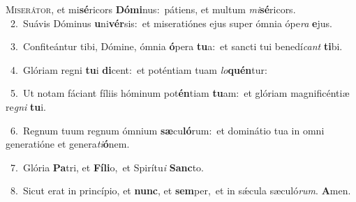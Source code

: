 \lettrine{\initial\textcolor{\initialcolor}{M}}{iserátor,} et mi\-\textbf{sé}\-ricors \textbf{Dó}\-\textbf{mi}nus:~\star pátiens, et multum \textit{mi}\-\textbf{sé}ricors.\\
{\numbfont\textcolor{\numbcolor}{~2.}}~Suávis Dóminus \textbf{u}\-ni\-\textbf{vér}\-sis:~\star et miseratiónes ejus super ómnia ópe\textit{ra} \textbf{e}\-jus.\par
{\numbfont\textcolor{\numbcolor}{~3.}}~Confiteántur tibi, Dómine, ómnia \textbf{ó}\-pera \textbf{tu}\-a:~\star et sancti tui benedí\textit{cant} \textbf{ti}\-bi.\par
{\numbfont\textcolor{\numbcolor}{~4.}}~Glóriam regni \textbf{tu}\-i \textbf{di}\-cent:~\star et poténtiam tuam \textit{lo}\-\textbf{quén}tur:\par
{\numbfont\textcolor{\numbcolor}{~5.}}~Ut notam fáciant fíliis hóminum pot\-\textbf{én}\-tiam \textbf{tu}\-am:~\star et glóriam magnificéntiæ re\textit{gni} \textbf{tu}\-i.\par
{\numbfont\textcolor{\numbcolor}{~6.}}~Regnum tuum regnum ómnium \textbf{sæ}\-cu\-\textbf{ló}\-rum:~\star et dominátio tua in omni generatióne et genera\-\textit{ti}\-\textbf{ó}nem.\par
{\numbfont\textcolor{\numbcolor}{~7.}}~Glória \textbf{Pa}\-tri, et \textbf{Fí}\-\textbf{li}o,~\star et Spirítu\textit{i} \textbf{Sanc}\-to.\par
{\numbfont\textcolor{\numbcolor}{~8.}}~Sicut erat in princípio, et \textbf{nunc}\-, et \textbf{sem}\-per,~\star et in sǽcula sæculó\-\textit{rum}\-. \textbf{A}\-men.\par
